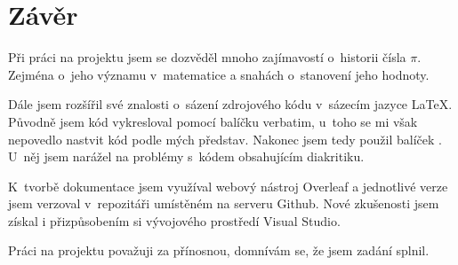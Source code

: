 \documentclass[11pt,a4paper,twoside,openright]{report}
\let\openright=\cleardoublepage
\begin{document}
	\chapter*{Závěr}
	\pagestyle{empty}
	Při práci na projektu jsem se dozvěděl mnoho zajímavostí o~historii čísla $\pi$. Zejména o~jeho významu v~matematice a snahách o~stanovení jeho hodnoty. 
	
	Dále jsem rozšířil své znalosti o~sázení zdrojového kódu v~sázecím jazyce \LaTeX. Původně jsem kód vykresloval pomocí balíčku verbatim, u~toho se mi však nepovedlo nastvit kód podle mých představ. Nakonec jsem tedy použil balíček . U~něj jsem narážel na problémy s~kódem obsahujícím diakritiku.
	
	K~tvorbě dokumentace jsem využíval webový nástroj Overleaf a jednotlivé verze jsem verzoval v~repozitáři umístěném na serveru Github. Nové zkušenosti jsem získal i přizpůsobením si vývojového prostředí Visual Studio.
	
	Práci na projektu považuji za přínosnou, domnívám se, že jsem zadání splnil.

	\nocite{dokumentace}
	\nocite{medium}
	\nocite{citace}
	\nocite{Historie_pi}
	\nocite{wiki:pi}
	\nocite{zvyrazneni_kodu}
	\nocite{clisting}
	\nocite{aproximace_pi}
	\printbibliography[title={Seznam použité literatury},heading={bibintoc}]
	
	\openright
	\listoffigures
	
	\clearpage
	\lstlistoflistings

	
	
	
\end{document}
